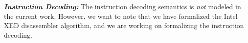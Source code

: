 \vspace{2pt}
\noindent\textbf{\emph{Instruction Decoding:}} The instruction decoding semantics is \emph{not} modeled in the current work. However, we want to note that we have formalized the Intel XED disassembler algorithm, and we are working on formalizing the instruction decoding.
%
%
